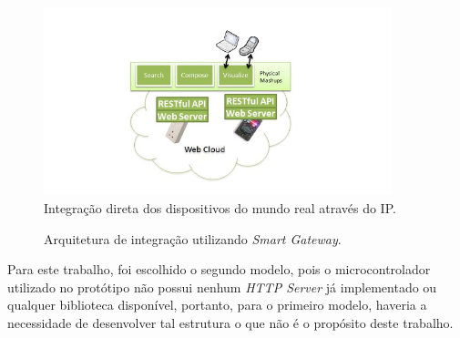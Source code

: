 \documentclass[12pt,a4paper,oneside]{report}
\begin{document}
\begin{figure}[h!]
   \centering
    \includegraphics[width=0.9\textwidth]{figuras/figura_2_4}
    \caption{Integração direta dos dispositivos do mundo real através do IP.}
    \label{http-embarcado}
\end{figure}
\begin{figure}[h!]
   \centering
   \caption{Arquitetura de integração utilizando \emph{Smart Gateway}.}
    \label{http-centralizado}
\end{figure}

Para este trabalho, foi escolhido o segundo modelo, pois o microcontrolador utilizado no protótipo não possui nenhum \emph{HTTP Server} já implementado ou qualquer biblioteca disponível, portanto, para o primeiro modelo, haveria a necessidade de desenvolver tal estrutura o que não é o propósito deste trabalho.
\end{document}
